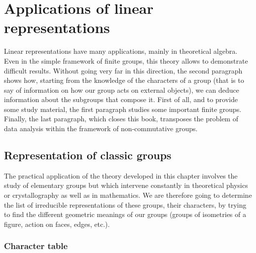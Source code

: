  
\chapter{Applications of linear representations}
\label{chap-applications-linear-representations}
 
 
Linear representations have many applications, mainly in theoretical algebra. Even in the simple framework of finite groups, this theory allows to demonstrate difficult results. Without going very far in this direction, the second paragraph shows how, starting from the knowledge of the characters of a group (that is to say of information on how our group acts on external objects), we can deduce information about the subgroups that compose it. First of all, and to provide some study material, the first paragraph studies some important finite groups. Finally, the last paragraph, which closes this book, transposes the problem of data analysis within the framework of non-commutative groups.
 
\section{Representation of classic groups}
 
The practical application of the theory developed in this chapter involves the study of elementary groups but which intervene constantly in theoretical physics or crystallography as well as in mathematics. We are therefore going to determine the list of irreducible representations of these groups, their characters, by trying to find the different geometric meanings of our groups (groups of isometries of a figure, action on faces, edges, etc.).
\subsection{Character table}
 
